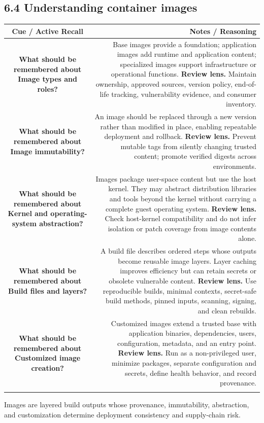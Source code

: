\documentclass[11pt]{article}
\newcommand{\CornellHeader}{\rowcolor{Navy}\color{white}\bfseries Cue / Active Recall & \color{white}\bfseries Notes / Reasoning \\\endhead}
\newcommand{\CornellRow}[2]{\cellcolor{CueGray}\textbf{#1} & #2 \\\addlinespace[3pt]}
\begin{document}
\subsection{6.4 Understanding container images}
\begin{longtable}{@{}C N@{}}
\CornellHeader
\CornellRow{What should be remembered about Image types and roles?}{Base images provide a foundation; application images add runtime and application content; specialized images support infrastructure or operational functions. \textbf{Review lens.} Maintain ownership, approved sources, version policy, end-of-life tracking, vulnerability evidence, and consumer inventory.}
\CornellRow{What should be remembered about Image immutability?}{An image should be replaced through a new version rather than modified in place, enabling repeatable deployment and rollback. \textbf{Review lens.} Prevent mutable tags from silently changing trusted content; promote verified digests across environments.}
\CornellRow{What should be remembered about Kernel and operating-system abstraction?}{Images package user-space content but use the host kernel. They may abstract distribution libraries and tools beyond the kernel without carrying a complete guest operating system. \textbf{Review lens.} Check host-kernel compatibility and do not infer isolation or patch coverage from image contents alone.}
\CornellRow{What should be remembered about Build files and layers?}{A build file describes ordered steps whose outputs become reusable image layers. Layer caching improves efficiency but can retain secrets or obsolete vulnerable content. \textbf{Review lens.} Use reproducible builds, minimal contexts, secret-safe build methods, pinned inputs, scanning, signing, and clean rebuilds.}
\CornellRow{What should be remembered about Customized image creation?}{Customized images extend a trusted base with application binaries, dependencies, users, configuration, metadata, and an entry point. \textbf{Review lens.} Run as a non-privileged user, minimize packages, separate configuration and secrets, define health behavior, and record provenance.}
\end{longtable}
\begin{sectionsummarybox}
Images are layered build outputs whose provenance, immutability, abstraction, and customization determine deployment consistency and supply-chain risk.
\end{sectionsummarybox}
\end{document}
